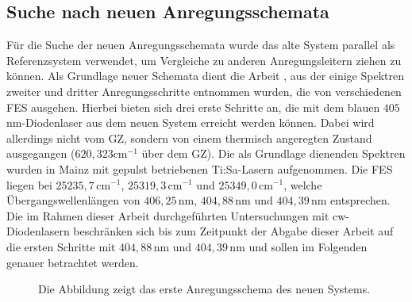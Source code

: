 \subsection{Suche nach neuen Anregungsschemata}\label{subsec:schema_suche}
Für die Suche der neuen Anregungsschemata wurde das alte System parallel als
Referenzsystem verwendet, um Vergleiche zu anderen Anregungsleitern ziehen
zu können. Als Grundlage neuer Schemata dient die Arbeit
\cite{raeder:2011:dissertation}, aus der einige Spektren zweiter und dritter
Anregungsschritte entnommen wurden, die von verschiedenen FES ausgehen. Hierbei
bieten sich drei erste Schritte an, die mit dem blauen $405\,$nm-Diodenlaser aus dem neuen System erreicht werden können. Dabei wird allerdings nicht vom GZ, sondern von einem thermisch angeregten
Zustand ausgegangen ($620,323$cm$^{-1}$ über dem GZ). Die als
Grundlage dienenden Spektren wurden in Mainz mit gepulst betriebenen
Ti:Sa-Lasern aufgenommen. Die FES liegen bei $25235,7\,$cm$^{-1}$,
$25319,3\,$cm$^{-1}$ und $25349,0\,$cm$^{-1}$, welche Übergangswellenlängen von $406,25\,$nm, $404,88\,$nm und $404,39\,$nm
entsprechen. Die im Rahmen dieser Arbeit durchgeführten Untersuchungen mit
cw-Diodenlasern beschränken sich bis zum Zeitpunkt der Abgabe dieser Arbeit auf
die ersten Schritte mit $404,88\,$nm und $404,39\,$nm und sollen im Folgenden genauer
betrachtet werden.\par
\begin{figure}[h]
 	\centering
	\caption[Anregungsschema, neu (1)]{Die Abbildung zeigt das
	erste Anregungsschema des neuen Systems.}\label{fig:anregungsschema_neu_01}
\end{figure}
